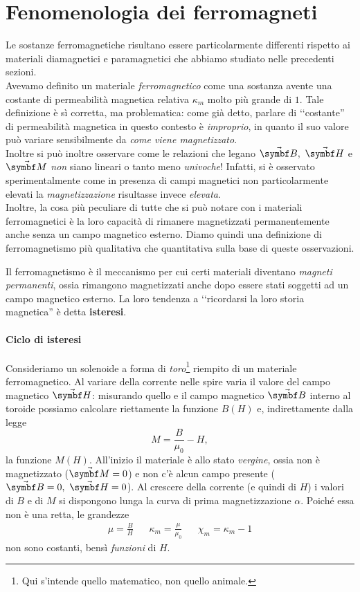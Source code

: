 \section{Fenomenologia dei ferromagneti}\label{ferromagnetici}
Le sostanze ferromagnetiche risultano essere particolarmente differenti rispetto ai materiali diamagnetici e paramagnetici che abbiamo studiato nelle precedenti sezioni.\\
Avevamo definito un materiale \textit{ferromagnetico} come una sostanza avente una costante di permeabilità magnetica relativa $\kappa_m$ molto più grande di $1$.
Tale definizione è sì corretta, ma problematica: come già detto, parlare di ‘‘costante'' di permeabilità magnetica in questo contesto è \textit{improprio}, in quanto il suo valore può variare sensibilmente da \textit{come viene magnetizzato}.\\
Inoltre si può inoltre osservare come le relazioni che legano $\vba{B},\ \vba{H}$ e $\vba{M}$ \textit{non} siano lineari o tanto meno \textit{univoche}! Infatti, si è osservato sperimentalmente come in presenza di campi magnetici non particolarmente elevati la \textit{magnetizzazione} risultasse invece \textit{elevata}.\\
Inoltre, la cosa più peculiare di tutte che si può notare con i materiali ferromagnetici è la loro capacità di rimanere magnetizzati permanentemente anche senza un campo magnetico esterno. Diamo quindi una definizione di ferromagnetismo più qualitativa che quantitativa sulla base di queste osservazioni.
\begin{define}[Ferromagnetismo]
	Il ferromagnetismo è il meccanismo per cui certi materiali diventano \textit{magneti permanenti}, ossia rimangono magnetizzati anche dopo essere stati soggetti ad un campo magnetico esterno. La loro tendenza a ‘‘ricordarsi la loro storia magnetica'' è detta \textbf{isteresi}.
\end{define}
\paragraph{Ciclo di isteresi}
Consideriamo un solenoide a forma di \textit{toro}\footnote{Qui s'intende quello matematico, non quello animale.} riempito di un materiale ferromagnetico. Al variare della corrente nelle spire varia il valore del campo magnetico $\vba{H}$: misurando quello e il campo magnetico $\vba{B}$ interno al toroide possiamo calcolare riettamente la funzione $B(H)$ e, indirettamente dalla legge
\begin{equation*}
	M=\frac{B}{\mu_0}-H,
\end{equation*}
la funzione $M(H)$.
All'inizio il materiale è allo stato \textit{vergine}, ossia non è magnetizzato ($\vba{M}=0$) e non c'è alcun campo presente ($\vba{B}=0,\ \vba{H}=0$). Al crescere della corrente (e quindi di $H$) i valori di $B$ e di $M$ si dispongono lunga la curva di prima magnetizzazione $\alpha$. Poiché essa non è una retta, le grandezze
\begin{align*}
	\mu=\frac{B}{H}&&\kappa_m=\frac{\mu}{\mu_0}&&\chi_m=\kappa_m-1
\end{align*}
non sono costanti, bensì \textit{funzioni} di $H$. 


